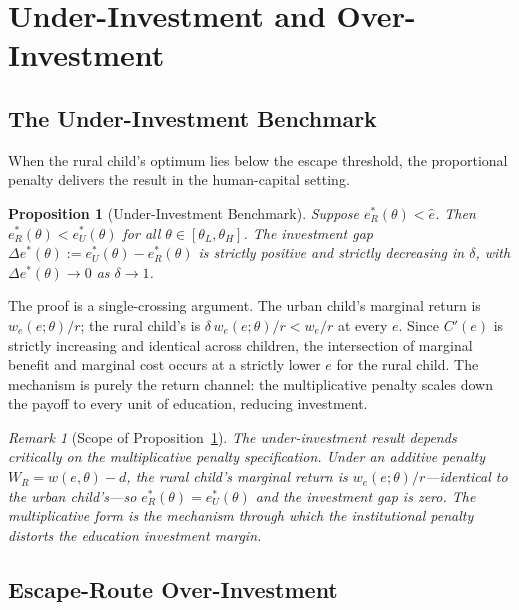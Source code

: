 \documentclass[12pt]{article}
\theoremstyle{plain}
\newtheorem{proposition}{Proposition}
\theoremstyle{definition}
\theoremstyle{remark}
\newtheorem{remark}{Remark}
\begin{document}
\section{Under-Investment and Over-Investment}

\subsection{The Under-Investment Benchmark}

When the rural child's optimum lies below the escape threshold, the proportional
penalty delivers the \citet{Arrow1973} result in the human-capital setting.

\begin{proposition}[Under-Investment Benchmark]
\label{prop:under}
Suppose $e^{*}_{R}(\theta)<\hat{e}$.  Then
$e^{*}_{R}(\theta)<e^{*}_{U}(\theta)$ for all $\theta\in[\theta_{L},\theta_{H}]$.
The investment gap $\Delta e^{*}(\theta):=e^{*}_{U}(\theta)-e^{*}_{R}(\theta)$
is strictly positive and strictly decreasing in $\delta$, with
$\Delta e^{*}(\theta)\to 0$ as $\delta\to 1$.
\end{proposition}

The proof is a single-crossing argument.  The urban child's marginal return is
$w_{e}(e;\theta)/r$; the rural child's is $\delta\,w_{e}(e;\theta)/r<w_{e}/r$ at
every $e$.  Since $C'(e)$ is strictly increasing and identical across children,
the intersection of marginal benefit and marginal cost occurs at a strictly lower
$e$ for the rural child.  The mechanism is purely the return channel: the
multiplicative penalty scales down the payoff to every unit of education,
reducing investment.

\begin{remark}[Scope of Proposition~\ref{prop:under}]
\textit{The under-investment result depends critically on the multiplicative
penalty specification.  Under an additive penalty $W_{R}=w(e,\theta)-d$, the
rural child's marginal return is $w_{e}(e;\theta)/r$---identical to the urban
child's---so $e^{*}_{R}(\theta)=e^{*}_{U}(\theta)$ and the investment gap is
zero.  The multiplicative form is the mechanism through which the institutional
penalty distorts the education investment margin.}
\end{remark}

\subsection{Escape-Route Over-Investment}
\end{document}
